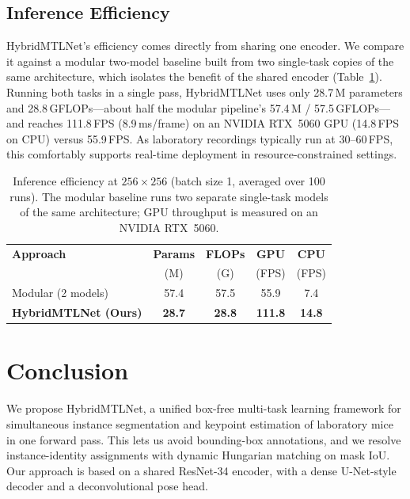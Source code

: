 \documentclass[runningheads]{llncs}
\begin{document}
\subsection{Inference Efficiency}
HybridMTLNet's efficiency comes directly from sharing one encoder. We
compare it against a modular two-model baseline built from two
single-task copies of the same architecture, which isolates the benefit
of the shared encoder (Table~\ref{tab:efficiency}). Running both tasks
in a single pass, HybridMTLNet uses only 28.7\,M parameters and
28.8\,GFLOPs---about half the modular pipeline's 57.4\,M / 57.5\,GFLOPs---and
reaches 111.8\,FPS (8.9\,ms/frame) on an NVIDIA RTX~5060 GPU (14.8\,FPS on CPU) versus
55.9\,FPS. As laboratory recordings typically run at 30--60\,FPS, this
comfortably supports real-time deployment in resource-constrained
settings.

\begin{table}[t]
\caption{Inference efficiency at $256\times256$ (batch size 1,
averaged over 100 runs). The modular baseline runs two separate
single-task models of the same architecture; GPU throughput is
measured on an NVIDIA RTX~5060.}
\label{tab:efficiency}
\centering
\begin{tabular}{lcccc}
\toprule
\textbf{Approach} & \textbf{Params} & \textbf{FLOPs} & \textbf{GPU} & \textbf{CPU} \\
                  & (M)             & (G)            & (FPS)        & (FPS) \\
\midrule
Modular (2 models)           & 57.4 & 57.5 & 55.9 & 7.4 \\
\textbf{HybridMTLNet (Ours)} & \textbf{28.7} & \textbf{28.8} & \textbf{111.8} & \textbf{14.8} \\
\bottomrule
\end{tabular}
\end{table}

\section{Conclusion}
\label{sec:conclusion}
We propose HybridMTLNet, a unified box-free multi-task learning
framework for simultaneous instance segmentation and keypoint
estimation of laboratory mice in one forward pass. This lets us
avoid bounding-box annotations, and we resolve instance-identity
assignments with dynamic Hungarian matching on mask IoU. Our approach is based on a shared ResNet-34 encoder, with a
dense U-Net-style decoder and a deconvolutional pose head.
\end{document}
